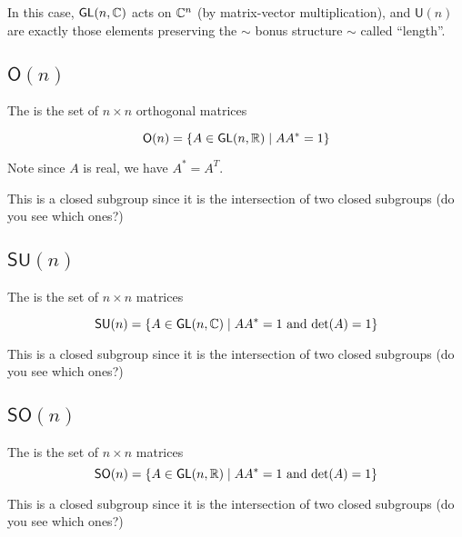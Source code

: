 \documentclass[../main.tex]{subfiles}
\begin{document}
In this case, $\mathsf{GL}(n,\mathbb{C})$ acts on $\mathbb{C}^n$ (by matrix-vector multiplication),
and $\mathsf{U}(n)$ are exactly those elements preserving the 
$\sim$ bonus structure $\sim$ called ``length''.

\subsection{$\mathsf{O}(n)$}

\begin{defn}
  The  is the set of $n \times n$ orthogonal matrices

  \[ 
    \mathsf{O}(n) = \{ A \in \mathsf{GL}(n,\mathbb{R}) \mid AA^* = 1 \}
  \]

  Note since $A$ is real, we have $A^* = A^T$.
\end{defn}

This is a closed subgroup since it is the intersection of two closed subgroups
(do you see which ones?)

\subsection{$\mathsf{SU}(n)$}

\begin{defn}
  The  is the set of $n \times n$ matrices

  \[
    \mathsf{SU}(n) = \{ A \in \mathsf{GL}(n,\mathbb{C}) \mid A A^* = 1 \text{ and } \text{det}(A) = 1 \}
  \]
\end{defn}

This is a closed subgroup since it is the intersection of two closed subgroups
(do you see which ones?)

\subsection{$\mathsf{SO}(n)$}

\begin{defn}
  The  is the set of $n \times n$ matrices
  \[
    \mathsf{SO}(n) = \{ A \in \mathsf{GL}(n,\mathbb{R}) \mid A A^* = 1 \text{ and } \text{det}(A) = 1 \}
  \]
\end{defn}

This is a closed subgroup since it is the intersection of two closed subgroups
(do you see which ones?)

\end{document}
